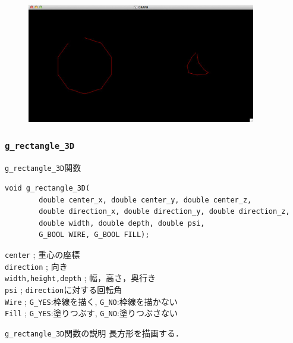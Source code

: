 \documentclass[platex,a4paper,12pt]{jsarticle}%
\begin{document}
\begin{figure}[htb]
\centering
	\includegraphics[width=100mm]{Canvas_g_polyline.eps}
\end{figure}



\clearpage
\subsubsection{\texttt{g\_rectangle\_3D}}

\begin{itembox}[l]{\texttt{g\_rectangle\_3D}関数}
\begin{verbatim}
void g_rectangle_3D(
        double center_x, double center_y, double center_z,
        double direction_x, double direction_y, double direction_z,
        double width, double depth, double psi,
        G_BOOL WIRE, G_BOOL FILL);
\end{verbatim}
\verb|center| ; 重心の座標\\
\verb|direction| ; 向き\\
\verb|width,height,depth| ; 幅，高さ，奥行き\\
\verb|psi| ; \verb|direction|に対する回転角\\
\verb|Wire| ; \verb|G_YES|:枠線を描く, \verb|G_NO|:枠線を描かない \\
\verb|Fill| ; \verb|G_YES|:塗りつぶす, \verb|G_NO|:塗りつぶさない 
\end{itembox}

\begin{itembox}[l]{\texttt{g\_rectangle\_3D}関数の説明}
長方形を描画する．
\end{itembox}
\end{document}
